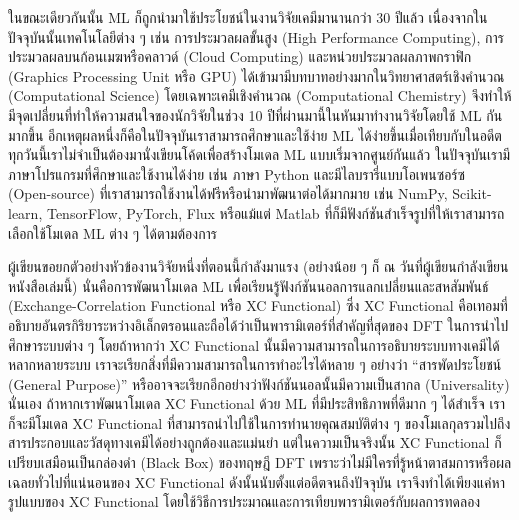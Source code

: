 ในขณะเดียวกันนั้น ML ก็ถูกนำมาใช้ประโยชน์ในงานวิจัยเคมีมานานกว่า 30 ปีแล้ว เนื่องจากในปัจจุบันนั้นเทคโนโลยีต่าง ๆ เช่น การประมวลผลขั้นสูง (High Performance Computing), การประมวลผลบนก้อนเมฆหรือคลาวด์ (Cloud Computing) และหน่วยประมวลผลภาพกราฟิก (Graphics Processing Unit หรือ GPU) ได้เข้ามามีบทบาทอย่างมากในวิทยาศาสตร์เชิงคำนวณ (Computational Science) โดยเฉพาะเคมีเชิงคำนวณ (Computational Chemistry) จึงทำให้มีจุดเปลี่ยนที่ทำให้ความสนใจของนักวิจัยในช่วง 10 ปีที่ผ่านมานี้ในหันมาทำงานวิจัยโดยใช้ ML กันมากขึ้น อีกเหตุผลหนึ่งก็คือในปัจจุบันเราสามารถศึกษาและใช้ง่าย ML ได้ง่ายขึ้นเมื่อเทียบกับในอดีต ทุกวันนี้เราไม่จำเป็นต้องมานั่งเขียนโค้ดเพื่อสร้างโมเดล ML แบบเริ่มจากศูนย์กันแล้ว ในปัจจุบันเรามีภาษาโปรแกรมที่ศึกษาและใช้งานได้ง่าย เช่น ภาษา Python และมีไลบรารี่แบบโอเพนซอร์ซ (Open-source) ที่เราสามารถใช้งานได้ฟรีหรือนำมาพัฒนาต่อได้มากมาย เช่น NumPy\autocite{harris2020array}, Scikit-learn\autocite{scikit-learn}, TensorFlow\autocite{tensorflow2015-whitepaper}, PyTorch\autocite{NEURIPS2019_9015}, Flux\autocite{innes2018} หรือแม้แต่ Matlab\autocite{MATLAB:2010} ที่ก็มีฟังก์ชันสำเร็จรูปที่ให้เราสามารถเลือกใช้โมเดล ML ต่าง ๆ ได้ตามต้องการ

ผู้เขียนขอยกตัวอย่างหัวข้องานวิจัยหนึ่งที่ตอนนี้กำลังมาแรง (อย่างน้อย ๆ ก็ ณ วันที่ผู้เขียนกำลังเขียนหนังสือเล่มนี้) นั่นคือการพัฒนาโมเดล ML เพื่อเรียนรู้ฟังก์ชันนอลการแลกเปลี่ยนและสหสัมพันธ์ (Exchange-Correlation Functional หรือ XC Functional)\autocite{balabin2009a} ซึ่ง XC Functional คือเทอมที่อธิบายอันตรกิริยาระหว่างอิเล็กตรอนและถือได้ว่าเป็นพารามิเตอร์ที่สำคัญที่สุดของ DFT ในการนำไปศึกษาระบบต่าง ๆ โดยถ้าหากว่า XC Functional นั้นมีความสามารถในการอธิบายระบบทางเคมีได้หลากหลายระบบ เราจะเรียกสิ่งที่มีความสามารถในการทำอะไรได้หลาย ๆ อย่างว่า \enquote{สารพัดประโยชน์ (General Purpose)} หรืออาจจะเรียกอีกอย่างว่าฟังก์ชันนอลนั้นมีความเป็นสากล (Universality) นั่นเอง ถ้าหากเราพัฒนาโมเดล XC Functional ด้วย ML ที่มีประสิทธิภาพที่ดีมาก ๆ ได้สำเร็จ เราก็จะมีโมเดล XC Functional ที่สามารถนำไปใช้ในการทำนายคุณสมบัติต่าง ๆ ของโมเลกุลรวมไปถึงสารประกอบและวัสดุทางเคมีได้อย่างถูกต้องและแม่นยำ แต่ในความเป็นจริงนั้น XC Functional ก็เปรียบเสมือนเป็นกล่องดำ (Black Box) ของทฤษฎี DFT เพราะว่าไม่มีใครที่รู้หน้าตาสมการหรือผลเฉลยทั่วไปที่แน่นอนของ XC Functional ดังนั้นนับตั้งแต่อดีตจนถึงปัจจุบัน เราจึงทำได้เพียงแค่หารูปแบบของ XC Functional โดยใช้วิธีการประมาณและการเทียบพารามิเตอร์กับผลการทดลอง 

